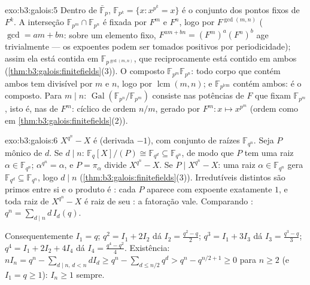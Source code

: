 \begin{solution}{exo:b3:galois:5}
Dentro de $\bar{\mathbb F}_p$, $\mathbb F_{p^k} = \{x : x^{p^k} =
x\}$ é o conjunto dos pontos fixos de $F^k$. A interseção $\mathbb F_{p^m}
\cap \mathbb F_{p^n}$ é fixada por $F^m$ e $F^n$, logo por
$F^{\gcd(m,n)}$ ($\gcd = am + bn$: sobre um elemento fixo, $F^{am +
bn} = (F^m)^a(F^n)^b$ age trivialmente --- os expoentes podem ser tomados
positivos por periodicidade); assim ela está contida em $\mathbb
F_{p^{\gcd(m,n)}}$, que reciprocamente está contido em ambos
(\cref{thm:b3:galois:finitefields}(3)). O composto $\mathbb
F_{p^m}\mathbb F_{p^n}$: todo corpo que contém ambos tem 
divisível por $m$ e $n$, logo por $\operatorname{lcm}(m,n)$; e
$\mathbb F_{p^{\operatorname{lcm}}}$ contém ambos: é o
composto. Para $m \mid n$: $\operatorname{Gal}(\mathbb
F_{p^n}/\mathbb F_{p^m})$ consiste nas potências de $F$ que fixam
$\mathbb F_{p^m}$, isto é, nas de $F^m$: cíclico de ordem $n/m$,
gerado por $F^m \colon x \mapsto x^{p^m}$ (ordem como em
\cref{thm:b3:galois:finitefields}(2)).
\end{solution}

\begin{solution}{exo:b3:galois:6}
$X^{q^n} - X$ é  (derivada $-1$), com conjunto de raízes
$\mathbb F_{q^n}$. Seja $P$ mônico  de  $d$.
Se $d \mid n$: $\mathbb F_q[X]/(P) \cong \mathbb F_{q^d}
\subseteq \mathbb F_{q^n}$, de modo que $P$ tem uma raiz $\alpha \in
\mathbb F_{q^n}$; $\alpha^{q^n} = \alpha$, e $P =
\pi_\alpha$ divide $X^{q^n} - X$. Se $P \mid X^{q^n} - X$: uma
raiz $\alpha \in \mathbb F_{q^n}$ gera $\mathbb F_{q^d}
\subseteq \mathbb F_{q^n}$, logo $d \mid n$
(\cref{thm:b3:galois:finitefields}(3)). Irredutíveis distintos
são primos entre si e o produto é : cada $P$ aparece com
expoente exatamente $1$, e toda raiz de $X^{q^n}-X$ é raiz
de seu : a fatoração vale. Comparando
: $q^n = \sum_{d\mid n} d\,I_d(q)$.

Consequentemente $I_1 = q$; $q^2 = I_1 + 2I_2$ dá $I_2 =
\frac{q^2 - q}2$; $q^3 = I_1 + 3I_3$ dá $I_3 = \frac{q^3 -
q}3$; $q^4 = I_1 + 2I_2 + 4I_4$ dá $I_4 = \frac{q^4 -
q^2}4$. Existência: $nI_n = q^n - \sum_{d \mid n,\, d < n}
dI_d \geq q^n - \sum_{d \leq n/2} q^d > q^n - q^{n/2 + 1} \geq
0$ para $n \geq 2$ (e $I_1 = q \geq 1$): $I_n \geq 1$ sempre.
\end{solution}

